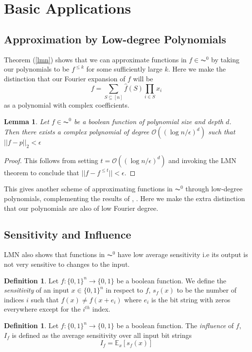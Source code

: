 \documentclass{amsart}
\newtheorem{lemma}[theorem]{Lemma}
\theoremstyle{definition}
\newtheorem{definition}[theorem]{Definition}
\theoremstyle{remark}
\numberwithin{equation}{section}
\theoremstyle{remark}
\begin{document}
\section{Basic Applications}

\subsection{Approximation by Low-degree Polynomials}
 Theorem (\ref{lmn}) shows that we can approximate functions in $f \in \AC^0$ by taking our polynomials to be $f^{\leq k}$ for some sufficiently large $k$. Here we make the distinction that our Fourier expansion of $f$ will be
$$f = \sum_{S \subseteq [n]} \hat{f}(S) \prod_{i \in S} x_i $$ as a polynomial with complex coefficients.
\begin{lemma}
  Let $f \in \AC^0$ be a boolean function of polynomial size and depth $d$. Then there exists a complex polynomial of degree $\mathcal{O}((\log{n/\epsilon})^d)$ such that $||f - p ||_2 < \epsilon$
\end{lemma}
%
\begin{proof}
This follows from setting $t = \mathcal{O}((\log{n/\epsilon})^d)$ and invoking the LMN theorem to conclude that $||f - f^{\leq t}|| < \epsilon$.
\end{proof}
%
\noindent This gives another scheme of approximating functions in $\AC^0$ through low-degree polynomials, complementing the results of \cite{razborov}, \cite{smolensky}. Here we make the extra distinction that our polynomials are also of low Fourier degree.

\subsection{Sensitivity and Influence}
LMN also shows that functions in $\AC^0$ have low average sensitivity i.e its output is not very sensitive to changes to the input.

\begin{definition}
  Let $f: \{0,1\}^n \rightarrow \{0,1\}$ be a boolean function. We define the \emph{sensitivity} of an input $x\in \{0,1\}^n$ in respect to $f$, $s_f(x)$ to be the number of indices $i$ such that $f(x) \neq f(x + e_i)$ where $e_i$ is the bit string with zeros everywhere except for the $i^{th}$ index.
\end{definition}

\begin{definition}
  Let $f: \{0,1\}^n \rightarrow \{0,1\}$ be a boolean function. The \emph{influence} of $f$, $I_f$ is defined as the average sensitivity over all input bit strings
  \begin{equation}
    I_f = \mathbb{E}_x[s_f(x)]
  \end{equation}
\end{definition}
\end{document}

